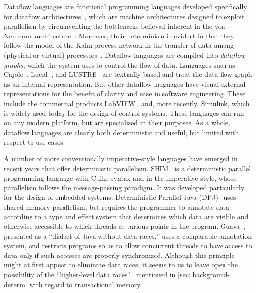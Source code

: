Dataflow languages are functional programming languages developed specifically for dataflow architectures~\cite{whiting94dataflow}, which are machine architectures designed to exploit parallelism by circumventing the bottlenecks believed inherent in the von Neumann architecture~\cite{arvind1990executing,johnston04dataflow}.  Moreover, their determinism is evident in that they follow the model of the Kahn process network in the transfer of data among (physical or virtual) processors~\cite{faustini82dataflow}.  Dataflow languages are compiled into \textit{dataflow graphs}, which the system uses to control the flow of data.  Languages such as Cajole~\cite{hankin81cajole}, Lucid~\cite{wadge85lucid}, and LUSTRE~\cite{halbwachs91lustre} are textually based and treat the data flow graph as an internal representation.  But other dataflow languages have visual external representations for the benefit of clarity and ease in software engineering.  These include the commercial products LabVIEW~\cite{labview12} and, more recently, Simulink\cite{simulink12}, which is widely used today for the design of control systems.  These languages can run on any modern platform, but are specialized in their purposes.  As a whole, dataflow languages are clearly both deterministic and useful, but limited with respect to use cases.

A number of more conventionally imperative-style languages have emerged in recent years that offer deterministic parallelism.  SHIM~\cite{edwards06shim, tardieu06scheduling, edwards08programming} is a deterministic parallel programming language with C-like syntax and in the imperative style, whose parallelism follows the message-passing paradigm.  It was developed particularly for the design of embedded systems.   Deterministic Parallel Java (DPJ)~\cite{bocchino09dpj} uses shared-memory parallelism, but requires the programmer to annotate data according to a type and effect system that determines which data are visible and otherwise accessible to which threads at various points in the program.  Guava~\cite{bacon00guava}, presented as a ``dialect of Java without data races,'' uses a comparable annotation system, and restricts programs so as to allow concurrent threads to have access to data only if such accesses are properly synchronized.  Although this principle might at first appear to eliminate data races, it seems to us to leave open the possibility of the ``higher-level data races''~\cite{artho03high} mentioned in \ref{sec: background-determ} with regard to transactional memory.

